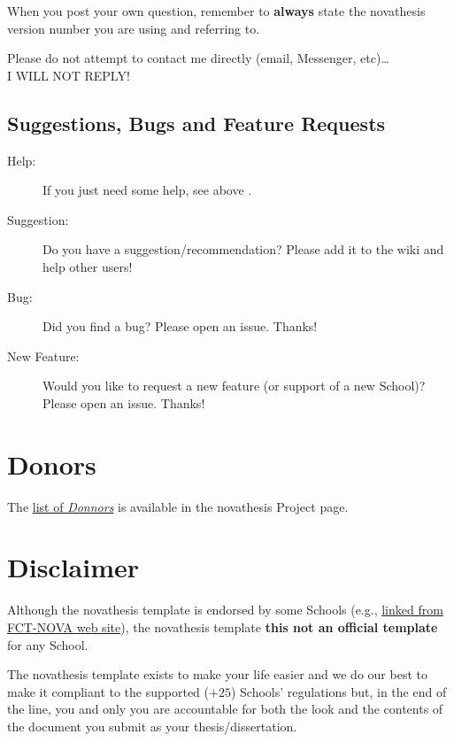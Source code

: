 When you post your own question, remember to \textbf{always} state the \gls{novathesis} version number you are using and referring to.

\begin{tcolorbox}[colback=blue!8]
	\centering
Please do not attempt to contact me directly (email, Messenger, etc)…\\I WILL NOT REPLY!
\end{tcolorbox}


\subsection{Suggestions, Bugs and Feature Requests} %
\label{sub:suggestions_bugs_and_feature_requests}

\begin{description}
  \item[Help:] If you just need some help, see above .
  \item[Suggestion:] \ntindex[Suggestions]{} Do you have a suggestion/recommendation? Please add it to the wiki and help other users!
  \item[Bug:] \ntindex[Bugs]{} Did you find a bug? Please open an issue. Thanks!
  \item[New Feature:]  Would you like to request a new feature (or support of a new School)? Please open an issue. Thanks!

\end{description}







\section{Donors}
\label{sec:donations}

\ntindex[Donations]{}

The \href{https://github.com/joaomlourenco/novathesis/wiki#donators}{list of \emph{Donnors}} is available in the \gls{novathesis} Project page.


\section{Disclaimer}
\label{sec:disclaimer}

\ntindex[Disclaimer]{}

Although the \gls{novathesis} template is endorsed by some Schools (e.g., \href{https://www.fct.unl.pt/estudante/informacao-academica/teses-e-dissertacoes}{linked from FCT-NOVA web site}), the \gls{novathesis} template \textbf{this not an official template} for any School.

The \gls{novathesis} template exists to make your life easier and we do our best to make it compliant to the supported ($+25$) Schools' regulations but, in the end of the line, you and only you are accountable for both the look and the contents of the document you submit as your thesis/dissertation.
